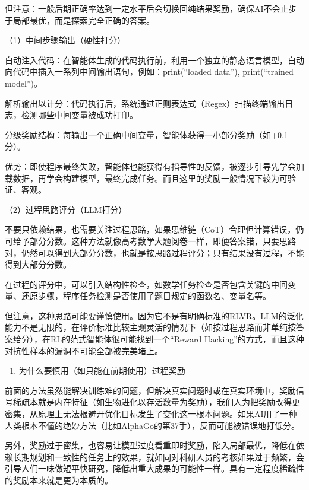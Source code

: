 但注意：一般后期正确率达到一定水平后会切换回纯结果奖励，确保AI不会止步于局部最优，而是探索完全正确的答案。

（1）中间步骤输出（硬性打分）

自动注入代码：在智能体生成的代码执行前，利用一个独立的静态语言模型，自动向代码中插入一系列中间输出语句，例如：print(``loaded data''), print(``trained model'')。

解析输出以计分：代码执行后，系统通过正则表达式（Regex）扫描终端输出日志，检测哪些中间变量被成功打印。

分级奖励结构：每输出一个正确中间变量，智能体获得一小部分奖励（如+0.1分）。

优势：即使程序最终失败，智能体也能获得有指导性的反馈，被逐步引导先学会加载数据，再学会构建模型，最终完成任务。而且这里的奖励一般情况下较为可验证、客观。

（2）过程思路评分（LLM打分）

不要只依赖结果，也需要关注过程思路，如果思维链（CoT）合理但计算错误，仍可给予部分分数。这种方法就像高考数学大题阅卷一样，即便答案错，只要思路对，仍然可以得到大部分分数，也就是按思路过程评分；只有结果没有过程，不能得到大部分分数。

在过程的评分中，可以引入结构性检查，如数学任务检查是否包含关键的中间变量、还原步骤，程序任务检测是否使用了题目规定的函数名、变量名等。

但注意，这种思路可能要谨慎使用。因为它不是有明确标准的RLVR。LLM的泛化能力不是无限的，在评价标准比较主观灵活的情况下（如按过程思路而非单纯按答案给分），在RL的范式智能体很可能找到一个``Reward Hacking''的方式，而且这种对抗性样本的漏洞不可能全部被完美堵上。

\begin{enumerate}
\def\labelenumi{\arabic{enumi}.}
\setcounter{enumi}{1}
\tightlist
\item
  为什么要慎用（如只能在前期使用）过程奖励
\end{enumerate}

前面的方法虽然能解决训练难的问题，但解决真实问题时或在真实环境中，奖励信号稀疏本就是内在特征（如生物进化以存活数量为奖励），我们人为把奖励改得更密集，从原理上无法根避开优化目标发生了变化这一根本问题。如果AI用了一种人类根本不懂的绝妙方法（比如AlphaGo的第37手），反而可能被错误地打低分。

另外，奖励过于密集，也容易让模型过度看重即时奖励，陷入局部最优，降低在依赖长期规划和一致性的任务上的效果，就如同对科研人员的考核如果过于频繁，会引导人们一味做短平快研究，降低出重大成果的可能性一样。具有一定程度稀疏性的奖励本来就是更为本质的。

